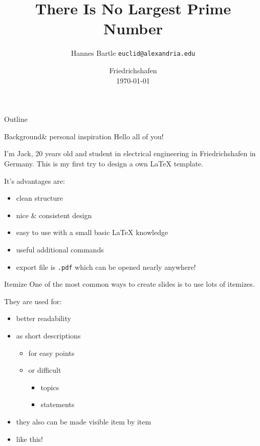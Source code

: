\documentclass[	12pt, 				
				t,					
				aspectratio=169]{beamer}
\title{There Is No Largest Prime Number}
\date{Friedrichshafen\\\today}
\author{Hannes Bartle \texttt{euclid@alexandria.edu}}
\institute{DHBW Ravensburg Campus Friedrichshafen}
\begin{document}
	
	\begin{frame}[noframenumbering]
		\titlepage
	\end{frame}


	\begin{frame}{Outline}
		\tableofcontents
	\end{frame}


	
	
	\begin{frame}{Background}{\& personal inspiration}
		Hello all of you! 
		
		I'm Jack, 20 years old and student in electrical engineering in Friedrichshafen in Germany.
		This is my first try to design a own \LaTeX{} template.
		
		It's advantages are:
		\begin{itemize}
			\item clean structure
			\item nice \& consistent design
			\item easy to use with a small basic \LaTeX{} knowledge
			\item useful additional commands
			\item export file is \texttt{.pdf} which can be opened nearly anywhere!
		\end{itemize}
	\end{frame}
	
	
	
	
	
	\begin{frame}{Itemize}{}
		One of the most common ways to create slides is to use lots of itemizes.
		
		They are used for:
		\begin{itemize}
			\item better readability
			\item as short descriptions
			\begin{itemize}
				\item for easy points
				\item or difficult
				\begin{itemize}
					\item topics
					\item statements
				\end{itemize}
			\end{itemize}
			\item <2-> they also can be made visible item by item
			\item <3-> like this!
		\end{itemize}
	\end{frame}
	
\end{document}
